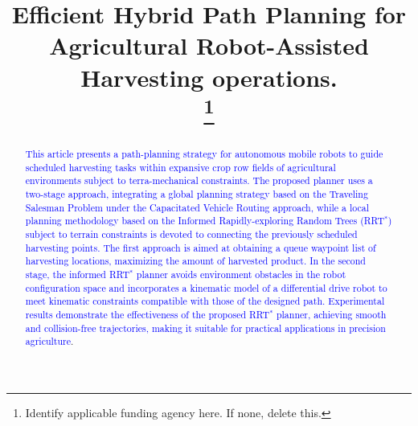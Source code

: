 \documentclass[conference]{IEEEtran}
\begin{document}
\title{Efficient Hybrid Path Planning for Agricultural Robot-Assisted Harvesting operations.\\
\thanks{Identify applicable funding agency here. If none, delete this.}
}

\author{
\and
{}
\and
{}
}

\maketitle

\begin{abstract}
\textcolor{blue}{This article presents a path-planning strategy for autonomous mobile robots to guide scheduled harvesting tasks within expansive crop row fields of agricultural environments subject to terra-mechanical constraints. The proposed planner uses a two-stage approach, integrating a global planning strategy based on the Traveling Salesman Problem under the Capacitated Vehicle Routing approach, while a local planning methodology based on the Informed Rapidly-exploring Random Trees (RRT$^*$) subject to terrain constraints is devoted to connecting the previously scheduled harvesting points. The first approach is aimed at obtaining a queue waypoint list of harvesting locations, maximizing the amount of harvested product. In the second stage, the informed RRT$^*$ planner avoids environment obstacles in the robot configuration space and incorporates a kinematic model of a differential drive robot to meet kinematic constraints compatible with those of the designed path. Experimental results demonstrate the effectiveness of the proposed RRT$^*$ planner, achieving smooth and collision-free trajectories, making it suitable for practical applications in precision agriculture}.  
\end{abstract}
\end{document}
